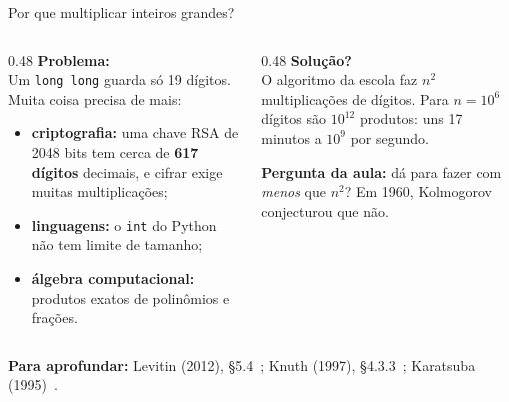 \documentclass[aspectratio=169,xcolor=table]{beamer}
\newcommand{\fonte}[1]{%
  \vfill
  {\tiny\color{gray!55!black}\textbf{Para aprofundar:} #1\par}%
}
\begin{document}
\begin{frame}{Por que multiplicar inteiros grandes?}
  \begin{columns}[T]
    \begin{column}{0.48\textwidth}
      \textbf{Problema:}\\[2pt]
      \scriptsize Um \texttt{long long} guarda só 19 dígitos. Muita coisa precisa de mais:
      \begin{itemize}\scriptsize
        \item \textbf{criptografia:} uma chave RSA de 2048 bits tem cerca de
              \textbf{617 dígitos} decimais, e cifrar exige muitas multiplicações;
        \item \textbf{linguagens:} o \texttt{int} do Python não tem limite de tamanho;
        \item \textbf{álgebra computacional:} produtos exatos de polinômios e frações.
      \end{itemize}
    \end{column}
    \begin{column}{0.48\textwidth}
      \textbf{Solução?}\\[2pt]
      \scriptsize O algoritmo da escola faz $n^2$ multiplicações de dígitos.
      Para $n=10^6$ dígitos são $10^{12}$ produtos: uns 17 minutos a $10^9$ por segundo.
      \medskip

      \textbf{Pergunta da aula:} dá para fazer com \emph{menos} que $n^2$?
      Em 1960, Kolmogorov conjecturou que não.
    \end{column}
  \end{columns}
  \fonte{Levitin (2012), \S 5.4~\cite{levitin2012introduction};
    Knuth (1997), \S 4.3.3~\cite{knuth1997seminumerical}; Karatsuba (1995)~\cite{karatsuba1995complexity}.}
\end{frame}
\end{document}
